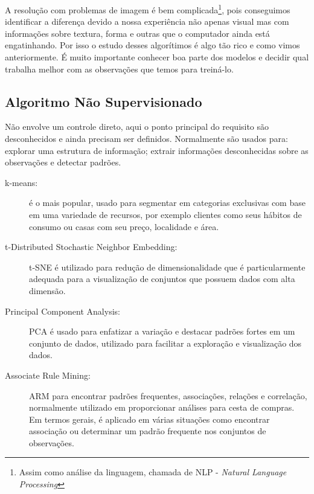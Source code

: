 A resolução com problemas de imagem é bem complicada\footnote{Assim como análise da linguagem, chamada de NLP - \textit{Natural Language Processing}}, pois conseguimos identificar a diferença devido a nossa experiência não apenas visual mas com informações sobre textura, forma e outras que o computador ainda está engatinhando. Por isso o estudo desses algorítimos é algo tão rico e como vimos anteriormente. É muito importante conhecer boa parte dos modelos e decidir qual trabalha melhor com as observações que temos para treiná-lo.

\subsection{Algoritmo Não Supervisionado}
Não envolve um controle direto, aqui o ponto principal do requisito são desconhecidos e ainda precisam ser definidos. Normalmente são usados para: explorar uma estrutura de informação; extrair informações desconhecidas sobre as observações e detectar padrões.
\begin{description}
	\item[k-means:] é o mais popular, usado para segmentar em categorias exclusivas com base em uma variedade de recursos, por exemplo clientes como seus hábitos de consumo ou casas com seu preço, localidade e área.
	\item[t-Distributed Stochastic Neighbor Embedding:] t-SNE é utilizado para redução de dimensionalidade que é particularmente adequada para a visualização de conjuntos que possuem dados com alta dimensão.
	\item[Principal Component Analysis:] PCA é usado para enfatizar a variação e destacar padrões fortes em um conjunto de dados, utilizado para facilitar a exploração e visualização dos dados.
	\item[Associate Rule Mining:] ARM para encontrar padrões frequentes, associações, relações e correlação, normalmente utilizado em proporcionar análises para cesta de compras. Em termos gerais, é aplicado em várias situações como encontrar associação ou determinar um padrão frequente nos conjuntos de observações.
\end{description}

